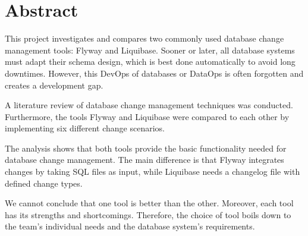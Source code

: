 \markleft{\abstractname}

\chapter*{Abstract}
%
This project investigates and compares two commonly used database change management tools: Flyway and Liquibase. Sooner or later, all database systems must adapt their schema design, which is best done automatically to avoid long downtimes. However, this DevOps of databases or DataOps is often forgotten and creates a development gap. 

%
A literature review of database change management techniques was conducted. Furthermore, the tools Flyway and Liquibase were compared to each other by implementing six different change scenarios.

%
The analysis shows that both tools provide the basic functionality needed for database change management. The main difference is that Flyway integrates changes by taking SQL files as input, while Liquibase needs a changelog file with defined change types.

%
We cannot conclude that one tool is better than the other. Moreover, each tool has its strengths and shortcomings. Therefore, the choice of tool boils down to the team's individual needs and the database system's requirements.

